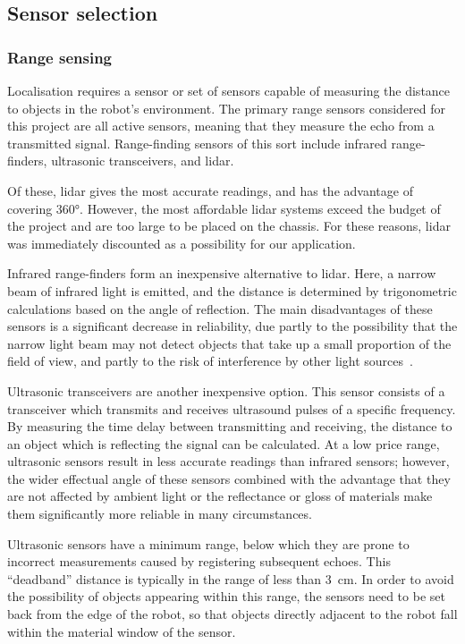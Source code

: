 \subsection{Sensor selection}\label{design/sensors}

\subsubsection{Range sensing}

Localisation requires a sensor or set of sensors capable of measuring the
distance to objects in the robot's environment. The primary range sensors considered for this
project are all active sensors, meaning that they measure the echo from a transmitted
signal. Range-finding sensors of this sort include infrared range-finders, ultrasonic
transceivers, and lidar.

Of these, lidar gives the most accurate readings, and has the advantage of
covering \ang{360}. However, the most affordable lidar systems exceed the budget
of the project and are too large to be placed on the chassis. For these reasons,
lidar was immediately discounted as a possibility for our application.

Infrared range-finders form an inexpensive alternative to lidar. Here, a narrow
beam of infrared light is emitted, and the distance is determined by trigonometric
calculations based on the angle of reflection. The main disadvantages of these
sensors is a significant decrease in reliability, due partly to the possibility that
the narrow light beam may not detect objects that take up a small proportion
of the field of view, and partly to the risk of interference by other light
sources~\cite{herbert00}.

Ultrasonic transceivers are another inexpensive option. This sensor
consists of a transceiver which transmits and receives ultrasound pulses of a
specific frequency. By measuring the time delay between transmitting and
receiving, the distance to an object which is reflecting the signal can be
calculated. At a low price range, ultrasonic sensors result in less accurate
readings than infrared sensors; however, the wider effectual angle of these sensors
combined with the advantage that they are not affected by ambient light or the
reflectance or gloss of materials make them significantly more reliable in many
circumstances.

Ultrasonic sensors have a minimum range, below which they are prone to incorrect
measurements caused by registering subsequent echoes. This ``deadband'' distance is
typically in the range of less than \SI{3}{\cm}. In order to avoid the
possibility of objects appearing within this range, the sensors need to be set
back from the edge of the robot, so that objects directly adjacent to the robot
fall within the material window of the sensor.

